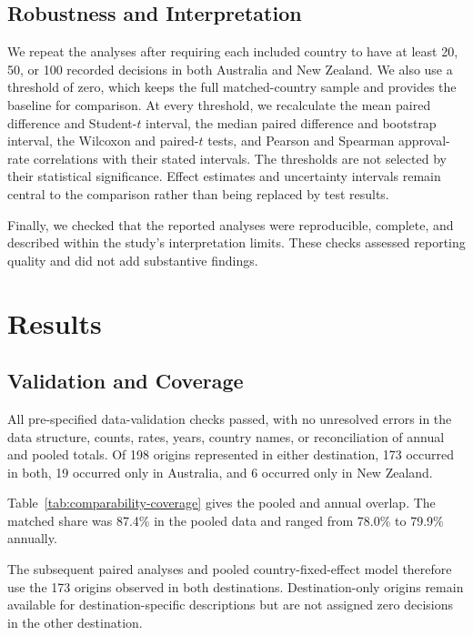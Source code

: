 \documentclass[runningheads]{llncs}
\begin{document}
\subsection{Robustness and Interpretation}

We repeat the analyses after requiring each included country to have at least 20, 50, or 100 recorded decisions in both Australia and New Zealand. We also use a threshold of zero, which keeps the full matched-country sample and provides the baseline for comparison. At every threshold, we recalculate the mean paired difference and Student-$t$ interval, the median paired difference and bootstrap interval, the Wilcoxon and paired-$t$ tests, and Pearson and Spearman approval-rate correlations with their stated intervals. The thresholds are not selected by their statistical significance. Effect estimates and uncertainty intervals remain central to the comparison rather than being replaced by test results.

Finally, we checked that the reported analyses were reproducible, complete, and described within the study's interpretation limits. These checks assessed reporting quality and did not add substantive findings.

\section{Results}

\subsection{Validation and Coverage}

All pre-specified data-validation checks passed, with no unresolved errors in the data structure, counts, rates, years, country names, or reconciliation of annual and pooled totals. Of 198 origins represented in either destination, 173 occurred in both, 19 occurred only in Australia, and 6 occurred only in New Zealand.

Table~\ref{tab:comparability-coverage} gives the pooled and annual overlap. The matched share was 87.4\% in the pooled data and ranged from 78.0\% to 79.9\% annually.



The subsequent paired analyses and pooled country-fixed-effect model therefore use the 173 origins observed in both destinations. Destination-only origins remain available for destination-specific descriptions but are not assigned zero decisions in the other destination.
\end{document}
